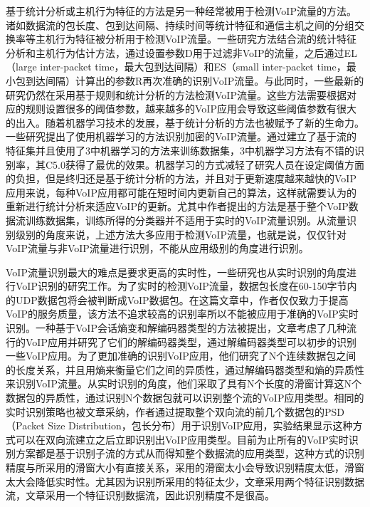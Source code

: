 基于统计分析或主机行为特征的方法是另一种经常被用于检测VoIP流量的方法。诸如数据流的包长度、包到达间隔、持续时间等统计特征和通信主机之间的分组交换率等主机行为特征被分析用于检测VoIP流量\supercite{2}。一些研究方法\supercite{19}结合流的统计特征分析和主机行为估计方法，通过设置参数D用于过滤非VoIP的流量，之后通过EL（large inter-packet time，最大包到达间隔）和ES（small inter-packet time，最小包到达间隔）计算出的参数R再次准确的识别VoIP流量。与此同时，一些最新的研究\supercite{20,21}仍然在采用基于规则和统计分析的方法检测VoIP流量。这些方法需要根据对应的规则设置很多的阈值参数，越来越多的VoIP应用会导致这些阈值参数有很大的出入。随着机器学习技术的发展，基于统计分析的方法也被赋予了新的生命力。一些研究\supercite{5}提出了使用机器学习的方法识别加密的VoIP流量。通过建立了基于流的特征集并且使用了3中机器学习的方法来训练数据集，3中机器学习方法有不错的识别率，其C5.0获得了最优的效果。机器学习的方式减轻了研究人员在设定阈值方面的负担，但是终归还是基于统计分析的方法，并且对于更新速度越来越快的VoIP应用来说，每种VoIP应用都可能在短时间内更新自己的算法，这样就需要认为的重新进行统计分析来适应VoIP的更新。尤其中作者提出的方法是基于整个VoIP数据流训练数据集，训练所得的分类器并不适用于实时的VoIP流量识别。从流量识别级别的角度来说，上述方法大多应用于检测VoIP流量，也就是说，仅仅针对VoIP流量与非VoIP流量进行识别，不能从应用级别的角度进行识别。

VoIP流量识别最大的难点是要求更高的实时性，一些研究也从实时识别的角度进行VoIP识别的研究工作。为了实时的检测VoIP流量，数据包长度在60-150字节内的UDP数据包将会被判断成VoIP数据包\supercite{3}。在这篇文章中，作者仅仅致力于提高VoIP的服务质量，该方法不追求较高的识别率所以不能被应用于准确的VoIP实时识别。一种基于VoIP会话熵变和解编码器类型的方法被提出\supercite{4}，文章考虑了几种流行的VoIP应用并研究了它们的解编码器类型，通过解编码器类型可以初步的识别一些VoIP应用。为了更加准确的识别VoIP应用，他们研究了N个连续数据包之间的长度关系，并且用熵来衡量它们之间的异质性，通过解编码器类型和熵的异质性来识别VoIP流量。从实时识别的角度，他们采取了具有N个长度的滑窗计算这N个数据包的异质性，通过识别N个数据包就可以识别整个流的VoIP应用类型。相同的实时识别策略也被文章\supercite{22}采纳，作者通过提取整个双向流的前几个数据包的PSD（Packet Size Distribution，包长分布）用于识别VoIP应用，实验结果显示这种方式可以在双向流建立之后立即识别出VoIP应用类型。目前为止所有的VoIP实时识别方案都是基于识别子流的方式从而得知整个数据流的应用类型，这种方式的识别精度与所采用的滑窗大小有直接关系，采用的滑窗太小会导致识别精度太低，滑窗太大会降低实时性。尤其因为识别所采用的特征太少，文章\supercite{4}采用两个特征识别数据流，文章\supercite{22}采用一个特征识别数据流，因此识别精度不是很高。

